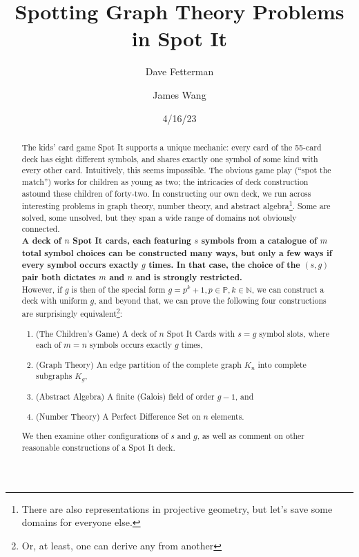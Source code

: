 \documentclass[11pt, oneside]{article} 	%
\title{Spotting Graph Theory Problems in Spot It}
\author[1]{Dave Fetterman}
\author[2]{James Wang}
\affil[1]{Obviously Unemployed}
\affil[2]{Surprisingly Employed}
\date{4/16/23}
\begin{document}
\maketitle

\begin{abstract}

The kids' card game Spot It supports a unique mechanic: every card of the 55-card deck has eight different symbols, and shares exactly one symbol of some kind with every other card. Intuitively, this seems impossible. The obvious game play (``spot the match'') works for children as young as two; the intricacies of deck construction astound these children of forty-two. In constructing our own deck, we run across interesting problems in graph theory, number theory, and abstract algebra\footnote{There are also representations in projective geometry, but let's save some domains for everyone else.}. Some are solved, some unsolved, but they span a wide range of domains not obviously connected.
\\

\textbf{A deck of $n$ Spot It cards, each featuring $s$ symbols from a catalogue of $m$ total symbol choices can be constructed many ways, but only a few ways if every symbol occurs exactly $g$ times. In that case, the choice of the $(s, g)$ pair both dictates $m$ and $n$ and is strongly restricted.}
\\

However, if $g$ is then of the special form $g=p^k+1, p \in \mathbb{P}, k \in \mathbb{N}$, we can construct a deck with uniform $g$, and beyond that, we can prove the following four constructions are surprisingly equivalent\footnote{Or, at least, one can derive any from another}:
\\
\begin{enumerate}
\item (The Children's Game) A deck of $n$ Spot It Cards with $s=g$ symbol slots, where each of $m = n$ symbols occurs exactly $g$ times,
\item (Graph Theory) An edge partition of the complete graph $K_n$ into complete subgraphs $K_g$,
\item (Abstract Algebra) A finite (Galois) field of order $g-1$, and
\item (Number Theory) A Perfect Difference Set\cite{1} on $n$ elements.
\end{enumerate} 
 
We then examine other configurations of $s$ and $g$, as well as comment on other reasonable constructions of a Spot It deck.

\end{abstract}
\end{document}
